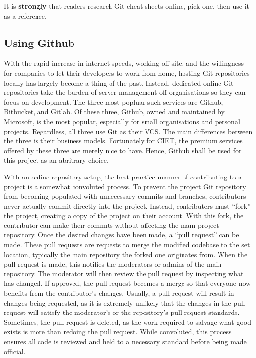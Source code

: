 \documentclass[11pt]{article}
\begin{document}
\noindent
It is \textbf{strongly} that readers research Git cheat sheets online, pick one, then use it as a reference.

\subsection{Using Github}

With the rapid increase in internet speeds, working off-site, and the willingness for companies to let their developers to work from home, hosting Git repositories locally has largely become a thing of the past. Instead, dedicated online Git repositories take the burden of server management off organisations so they can focus on development. The three most popluar such services are Github, Bitbucket, and Gitlab. Of these three, Github, owned and maintained by Microsoft, is the most popular, especially for small organisations and personal projects. Regardless, all three use Git as their VCS. The main differences between the three is their business models. Fortunately for CIET, the premium services offered by these three are merely nice to have. Hence, Github shall be used for this project as an abritrary choice.

With an online repository setup, the best practice manner of contributing to a project is a somewhat convoluted process. To prevent the project Git repository from becoming populated with unnecessary commits and branches, contributors never actually commit directly into the project. Instead, contributers must ``fork'' the project, creating a copy of the project on their account. With this fork, the contributor can make their commits without affecting the main project repository. Once the desired changes have been made, a ``pull request'' can be made. These pull requests are requests to merge the modified codebase to the set location, typically the main repository the forked one originates from. When the pull request is made, this notifies the moderators or admins of the main repository. The moderator will then review the pull request by inspecting what has changed. If approved, the pull request becomes a merge so that everyone now benefits from the contributor's changes. Usually, a pull request will result in changes being requested, as it is extremely unlikely that the changes in the pull request will satisfy the moderator's or the repository's pull request standards. Sometimes, the pull request is deleted, as the work required to salvage what good exists is more than redoing the pull request. While convoluted, this process ensures all code is reviewed and held to a necessary standard before being made official.
\end{document}
